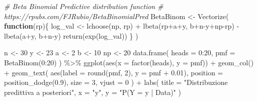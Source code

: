 \documentclass[
  10pt,
  italian,
  a4paper,
  extrafontsizes,onecolumn,openright
  ]{memoir}
\newenvironment{Shaded}{\begin{snugshade}}{\end{snugshade}}
\newcommand{\AttributeTok}[1]{\textcolor[rgb]{0.77,0.63,0.00}{#1}}
\newcommand{\CommentTok}[1]{\textcolor[rgb]{0.56,0.35,0.01}{\textit{#1}}}
\newcommand{\ControlFlowTok}[1]{\textcolor[rgb]{0.13,0.29,0.53}{\textbf{#1}}}
\newcommand{\DecValTok}[1]{\textcolor[rgb]{0.00,0.00,0.81}{#1}}
\newcommand{\FloatTok}[1]{\textcolor[rgb]{0.00,0.00,0.81}{#1}}
\newcommand{\FunctionTok}[1]{\textcolor[rgb]{0.00,0.00,0.00}{#1}}
\newcommand{\NormalTok}[1]{#1}
\newcommand{\OtherTok}[1]{\textcolor[rgb]{0.56,0.35,0.01}{#1}}
\newcommand{\SpecialCharTok}[1]{\textcolor[rgb]{0.00,0.00,0.00}{#1}}
\newcommand{\StringTok}[1]{\textcolor[rgb]{0.31,0.60,0.02}{#1}}
\begin{document}
\begin{Shaded}
\begin{Highlighting}[]
\CommentTok{\# Beta Binomial Predictive distribution function}
\CommentTok{\# https://rpubs.com/FJRubio/BetaBinomialPred}
\NormalTok{BetaBinom }\OtherTok{\textless{}{-}} \FunctionTok{Vectorize}\NormalTok{(}
  \ControlFlowTok{function}\NormalTok{(rp)\{}
\NormalTok{  log\_val }\OtherTok{\textless{}{-}} \FunctionTok{lchoose}\NormalTok{(np, rp) }\SpecialCharTok{+}
    \FunctionTok{lbeta}\NormalTok{(rp}\SpecialCharTok{+}\NormalTok{a}\SpecialCharTok{+}\NormalTok{y, b}\SpecialCharTok{+}\NormalTok{n}\SpecialCharTok{{-}}\NormalTok{y}\SpecialCharTok{+}\NormalTok{np}\SpecialCharTok{{-}}\NormalTok{rp) }\SpecialCharTok{{-}}
    \FunctionTok{lbeta}\NormalTok{(a}\SpecialCharTok{+}\NormalTok{y, b}\SpecialCharTok{+}\NormalTok{n}\SpecialCharTok{{-}}\NormalTok{y)}
  \FunctionTok{return}\NormalTok{(}\FunctionTok{exp}\NormalTok{(log\_val))}
\NormalTok{  \}}
\NormalTok{)}

\NormalTok{n }\OtherTok{\textless{}{-}} \DecValTok{30}
\NormalTok{y }\OtherTok{\textless{}{-}} \DecValTok{23}
\NormalTok{a }\OtherTok{\textless{}{-}} \DecValTok{2}
\NormalTok{b }\OtherTok{\textless{}{-}} \DecValTok{10}
\NormalTok{np }\OtherTok{\textless{}{-}} \DecValTok{20}
\FunctionTok{data.frame}\NormalTok{(}
  \AttributeTok{heads =} \DecValTok{0}\SpecialCharTok{:}\DecValTok{20}\NormalTok{,}
  \AttributeTok{pmf =} \FunctionTok{BetaBinom}\NormalTok{(}\DecValTok{0}\SpecialCharTok{:}\DecValTok{20}\NormalTok{)}
\NormalTok{) }\SpecialCharTok{\%\textgreater{}\%}
\FunctionTok{ggplot}\NormalTok{(}\FunctionTok{aes}\NormalTok{(}\AttributeTok{x =} \FunctionTok{factor}\NormalTok{(heads), }\AttributeTok{y =}\NormalTok{ pmf)) }\SpecialCharTok{+}
  \FunctionTok{geom\_col}\NormalTok{() }\SpecialCharTok{+}
  \FunctionTok{geom\_text}\NormalTok{(}
    \FunctionTok{aes}\NormalTok{(}\AttributeTok{label =} \FunctionTok{round}\NormalTok{(pmf, }\DecValTok{2}\NormalTok{), }\AttributeTok{y =}\NormalTok{ pmf }\SpecialCharTok{+} \FloatTok{0.01}\NormalTok{),}
    \AttributeTok{position =} \FunctionTok{position\_dodge}\NormalTok{(}\FloatTok{0.9}\NormalTok{),}
    \AttributeTok{size =} \DecValTok{3}\NormalTok{,}
    \AttributeTok{vjust =} \DecValTok{0}
\NormalTok{  ) }\SpecialCharTok{+}
  \FunctionTok{labs}\NormalTok{(}
    \AttributeTok{title =} \StringTok{"Distribuzione predittiva a posteriori"}\NormalTok{,}
    \AttributeTok{x =} \StringTok{"y\textquotesingle{}"}\NormalTok{,}
    \AttributeTok{y =} \StringTok{"P(Y = y\textquotesingle{} | Data)"}
\NormalTok{  )}
\end{Highlighting}
\end{Shaded}
\end{document}
